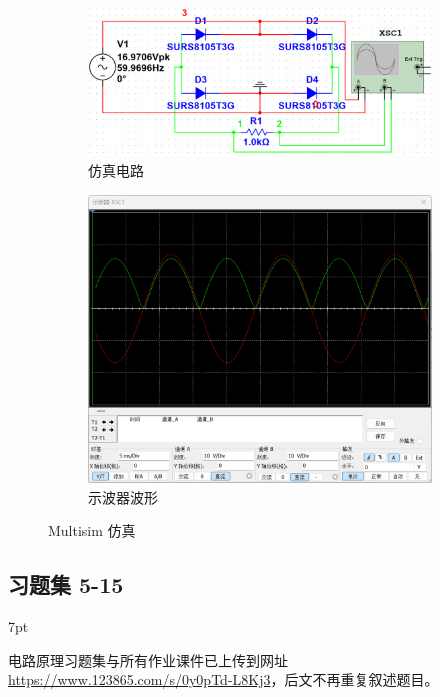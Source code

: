 \documentclass[UTF8]{report}
\theoremstyle{MyLineTheoremStyle} %
\theoremstyle{MyBlockTheoremStyle} %
\theoremstyle{MySubsubsectionStyle} %
\newenvironment{graybox}{%
        \def\FrameCommand{%
        \hspace{1pt}%
        {\color{gray}\small \vrule width 2pt}%
        {\color{graybox_color}\vrule width 4pt}%
        \colorbox{graybox_color}%
        }%
        \MakeFramed{\advance\hsize-\width\FrameRestore}%
        \noindent\hspace{-4.55pt}%
        \begin{adjustwidth}{}{7pt}%
        \vspace{2pt}\vspace{2pt}%
        }
        {%
        \vspace{2pt}\end{adjustwidth}\endMakeFramed%
        }
\begin{document}
\begin{figure}[H]\centering
\begin{subfigure}[b]{\columnwidth}\centering
    \includegraphics[width=\columnwidth]{assets/7/e6767042d587b4f2ea07f547a007dc1f.png}
    \caption{仿真电路}
\end{subfigure}\hfill
\begin{subfigure}[b]{\columnwidth}\centering
    \includegraphics[width=\columnwidth]{assets/7/d6a5ae36fb1ce8222b2554fb80254b4a.png}
    \caption{示波器波形}
\end{subfigure}
\caption{Multisim 仿真}
\label{Multisim 仿真}
\end{figure}

\subsection{习题集 5-15}\vspace*{-4mm}
\begin{graybox}
电路原理习题集与所有作业课件已上传到网址 \href{https://www.123865.com/s/0y0pTd-L8Kj3}{https://www.123865.com/s/0y0pTd-L8Kj3}，后文不再重复叙述题目。
\end{graybox}
\end{document}
